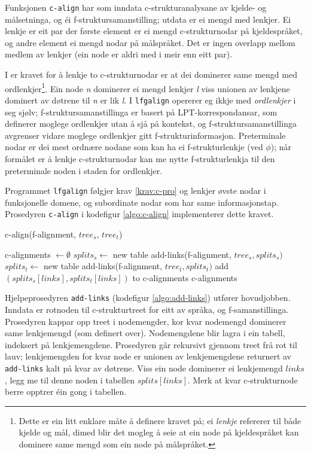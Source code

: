 \documentclass[11pt,a4paper,oneside,draft]{report}
\begin{document}
Funksjonen \texttt{c-align} har som inndata c-strukturanalysane av kjelde- og
målsetninga, og éi f-struktursamanstilling; utdata er ei mengd med
lenkjer. Ei lenkje er eit par der første element er ei mengd
c-strukturnodar på kjeldespråket, og andre element ei mengd nodar på
målspråket. Det er ingen overlapp mellom medlem av lenkjer (ein node
er aldri med i meir enn eitt par).

I \citet[s.~77]{dyvik2009lmp} er kravet for å lenkje to
c-strukturnodar er at dei dominerer same mengd med
ordlenkjer\footnote{Dette er ein litt enklare måte å definere kravet på; ei
        \emph{lenkje} refererer til både kjelde og mål, dimed blir det
        mogleg å seie at ein node på kjeldespråket kan dominere same
        mengd som ein node på målspråket. }. Ein node \emph{n} dominerer ei mengd lenkjer \emph{l} viss
unionen av lenkjene dominert av døtrene til \emph{n} er lik \emph{l}. I
\texttt{lfgalign} opererer eg ikkje med \emph{ordlenkjer} i seg sjølv;
f-struktursamanstillinga er basert på LPT-korrespondansar, som
definerer moglege ordlenkjer utan å sjå på kontekst, og
f-struktursamanstillinga avgrenser vidare moglege ordlenkjer gitt
f-strukturinformasjon. Preterminale nodar er dei mest ordnære nodane
som kan ha ei f-strukturlenkje (ved $\phi$); når formålet er å lenkje
c-strukturnodar kan me nytte f-strukturlenkja til den preterminale
noden i staden for ordlenkjer.

Programmet \texttt{lfgalign} følgjer krav \ref{krav:c-pro} og
lenkjer øvste nodar i funksjonelle domene, og subordinate nodar som
har same informasjonstap. Prosedyren \texttt{c-align} i kodefigur
\ref{algo:c-align} implementerer dette kravet. 

 \begin{algorithm}[]
   \caption{c-align(f-alignment, $tree_s$, $tree_t$)}
   \label{algo:c-align}
    
   c-alignments $\gets \emptyset$ \;
   $splits_s \gets$ new table \;
   add-links(f-alignment, $tree_s, splits_s)$  \;
   $splits_t \gets$ new table \;
   add-links(f-alignment, $tree_t, splits_t)$  \;
    {
        {
             add $(splits_s[links],splits_t[links])$ to c-alignments \;
        }
    }
    \Return c-alignments \;
    \end{algorithm}    

Hjelpeprosedyren \texttt{add-links} (kodefigur \ref{algo:add-links}) utfører
hovudjobben. Inndata er rotnoden til c-strukturtreet for eitt av
språka, og f-samanstillinga. Prosedyren kappar opp treet i
nodemengder, kor kvar nodemengd dominerer same lenkjemengd (som
definert over).  Nodemengdene blir lagra i ein tabell, indeksert på
lenkjemengdene. Prosedyren går rekursivt gjennom treet frå rot til
lauv; lenkjemengden for kvar node er unionen av lenkjemengdene
returnert av \texttt{add-links} kalt på kvar av døtrene. Viss ein node
dominerer ei lenkjemengd $links$, legg me til denne noden i tabellen
$splits[links]$. Merk at kvar c-strukturnode berre opptrer éin gong i
tabellen.
\end{document}
